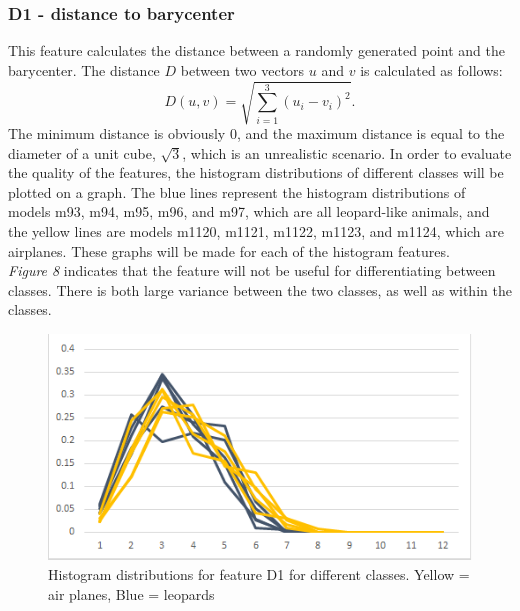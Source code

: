 \documentclass{bigdata}
\begin{document}
\subsubsection{D1 - distance to barycenter}
This feature calculates the distance between a randomly generated point and the barycenter. The distance $D$ between two vectors $u$ and $v$ is calculated as follows:
\begin{equation}
D(u,v) = \sqrt{\sum\limits_{i=1}^3 (u_i - v_i)^2}.
\end{equation}
The minimum distance is obviously 0, and the maximum distance is equal to the diameter of a unit cube, $\sqrt{3}$, which is an unrealistic scenario.
In order to evaluate the quality of the features, the histogram distributions of different classes will be plotted on a graph. The blue lines represent the histogram distributions of models m93, m94, m95, m96, and m97, which are all leopard-like animals, and the yellow lines are models m1120, m1121, m1122, m1123, and m1124, which are airplanes. These graphs will be made for each of the histogram features.\\
 \textit{Figure 8} indicates that the feature will not be useful for differentiating between classes. There is both large variance between the two classes, as well as within the classes.

\begin{figure}[h!]
	\begin{center}
    \includegraphics[width=0.7\linewidth]{Pictures/Part3/D1.png}
    \caption{Histogram distributions for feature D1 for different classes. Yellow = air planes, Blue = leopards}
  \label{fig:eccentricity}
  	\end{center}
\end{figure}
\end{document}
